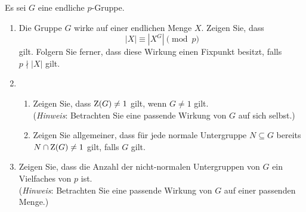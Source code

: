 \begin{question}[subtitle ={Wirkung von $p$-Grupppen}]
  Es sei $G$ eine endliche $p$-Gruppe.
  \begin{enumerate}
    \item
      Die Gruppe $G$ wirke auf einer endlichen Menge $X$.
      Zeigen Sie, dass
      \[
        |X| \equiv |X^G| \pmod{p}
      \]
      gilt.
      Folgern Sie ferner, dass diese Wirkung einen Fixpunkt besitzt, falls $p \nmid |X|$ gilt.
    \item
      \begin{enumerate}
        \item
          Zeigen Sie, dass $\operatorname{Z}(G) \neq 1$ gilt, wenn $G \neq 1$ gilt. \\
          (\emph{Hinweis}: Betrachten Sie eine passende Wirkung von $G$ auf sich selbst.)
        \item
          Zeigen Sie allgemeiner, dass für jede normale Untergruppe $N \subseteq G$ bereits $N \cap \operatorname{Z}(G) \neq 1$ gilt, falls $G$ gilt.
      \end{enumerate}
    \item
      Zeigen Sie, dass die Anzahl der nicht-normalen Untergruppen von $G$ ein Vielfaches von $p$ ist. \\
      (\emph{Hinweis}: Betrachten Sie eine passende Wirkung von $G$ auf einer passenden Menge.)
  \end{enumerate}
\end{question}


